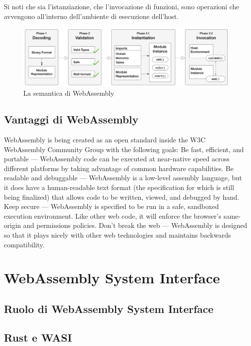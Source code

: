 Si noti che sia l'istanziazione, che l'invocazione di funzioni, sono operazioni che avvengono all'interno dell'ambiente di esecuzione dell'host.
\begin{figure}
        \begin{center}
                \includegraphics[width=0.97\columnwidth]{images/wasmSemanticPhases.png}
        \end{center}
        \caption{La semantica di WebAssembly}
        \label{fig:wasmPhases}
\end{figure}

\newpage
\subsection{Vantaggi di WebAssembly}
WebAssembly is being created as an open standard inside the W3C WebAssembly Community Group with the following goals:
Be fast, efficient, and portable — WebAssembly code can be executed at near-native speed across different platforms by taking advantage of common hardware capabilities.
Be readable and debuggable — WebAssembly is a low-level assembly language, but it does have a human-readable text format (the specification for which is still being finalized) that allows code to be written, viewed, and debugged by hand.
Keep secure — WebAssembly is specified to be run in a safe, sandboxed execution environment. Like other web code, it will enforce the browser's same-origin and permissions policies.
Don't break the web — WebAssembly is designed so that it plays nicely with other web technologies and maintains backwards compatibility.


\newpage
\section{WebAssembly System Interface}
\label{sec:WASI}
\subsection{Ruolo di WebAssembly System Interface}
\subsection{Rust e WASI}
